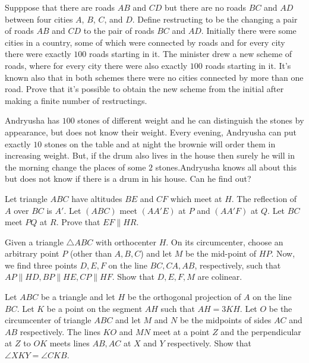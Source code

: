 \documentclass[11pt]{scrartcl}
\begin{document}
\begin{problem}[4875666253256352039]
Supppose that there are roads $AB$ and $CD$ but there are no roads $BC$ and $AD$ between four cities $A$, $B$, $C$, and $D$. Define restructing to be the changing a pair of roads $AB$ and $CD$ to the pair of roads $BC$ and $AD$. Initially there were some cities in a country, some of which were connected by roads and for every city there were exactly $100$ roads starting in it. The minister drew a new scheme of roads, where for every city there were also exactly $100$ roads starting in it. It's known also that in both schemes there were no cities connected by more than one road.
Prove that it's possible to obtain the new scheme from the initial after making a finite number of restructings.
\end{problem}
\begin{problem}[499788610931519]
	Andryusha has $100$ stones of different weight and he can distinguish the stones by appearance, but does not know their weight. Every evening, Andryusha can put exactly $10$ stones on the table and at night the brownie will order them in increasing weight. But, if the drum also lives in the house then surely he will in the morning change the places of some $2$ stones.Andryusha knows all about this but does not know if there is a drum in his house. Can he find out?
\end{problem}
\begin{problem}[210358073900610]
Let triangle $ABC$ have altitudes $BE$ and $CF$ which meet at $H$. The reflection of $A$ over $BC$ is $A'$. Let $(ABC)$ meet $(AA'E)$ at $P$ and $(AA'F)$ at $Q$. Let $BC$ meet $PQ$ at $R$. Prove that $EF \parallel HR$.
\end{problem}
\begin{problem}[296367141382799]
Given a triangle $ \triangle{ABC} $ with orthocenter $ H $. On its circumcenter, choose an arbitrary point $ P $ (other than $ A,B,C $) and let $ M $ be the mid-point of $ HP $. Now, we find three points $ D,E,F $ on the line $ BC, CA, AB $, respectively, such that $ AP \parallel HD, BP \parallel HE, CP \parallel HF $. Show that $ D, E, F, M $ are colinear.
\end{problem}
\begin{problem}[493493847475466779]
Let $ABC$ be a triangle and let $H$ be the orthogonal projection of $A$ on the line $BC$. Let $K$ be a point on the segment $AH$ such that $AH = 3 KH$. Let $O$ be the circumcenter of triangle $ABC$ and let $M$ and $N$ be the midpoints of sides $AC$ and $AB$ respectively. The lines $KO$ and $MN$ meet at a point $Z$ and the perpendicular at $Z$ to $OK$ meets lines $AB, AC$ at $X$ and $Y$ respectively. Show that $\angle XKY = \angle CKB$.
\end{problem}
\end{document}
